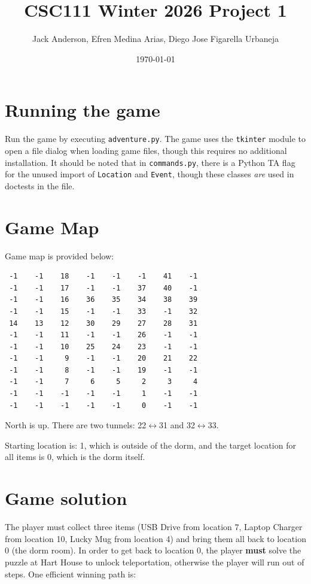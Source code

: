 \documentclass[11pt]{article}
\title{CSC111 Winter 2026 Project 1}
\author{Jack Anderson, Efren Medina Arias, Diego Jose Figarella Urbaneja}
\date{\today}
\begin{document}
\maketitle

\section*{Running the game}
Run the game by executing \verb|adventure.py|. The game uses the \verb|tkinter| module to open a file dialog when loading game files, though this requires no additional installation. It should be noted that in \verb|commands.py|, there is a Python TA flag for the unused import of \verb|Location| and \verb|Event|, though these classes \textit{are} used in doctests in the file.

\section*{Game Map}
Game map is provided below:

\begin{verbatim}
 -1    -1    18    -1    -1    -1    41    -1
 -1    -1    17    -1    -1    37    40    -1
 -1    -1    16    36    35    34    38    39
 -1    -1    15    -1    -1    33    -1    32
 14    13    12    30    29    27    28    31
 -1    -1    11    -1    -1    26    -1    -1
 -1    -1    10    25    24    23    -1    -1
 -1    -1     9    -1    -1    20    21    22
 -1    -1     8    -1    -1    19    -1    -1
 -1    -1     7     6     5     2     3     4
 -1    -1    -1    -1    -1     1    -1    -1
 -1    -1    -1    -1    -1     0    -1    -1
\end{verbatim}
North is up. There are two tunnels: 22$\leftrightarrow$31 and 32$\leftrightarrow$33.

Starting location is: 1, which is outside of the dorm, and the target location for all items is 0, which is the dorm itself.

\section*{Game solution}
The player must collect three items (USB Drive from location 7, Laptop Charger from location 10, Lucky Mug from location 4) and bring them all back to location 0 (the dorm room). In order to get back to location 0, the player \textbf{must} solve the puzzle at Hart House to unlock teleportation, otherwise the player will run out of steps. One efficient winning path is:
\end{document}
